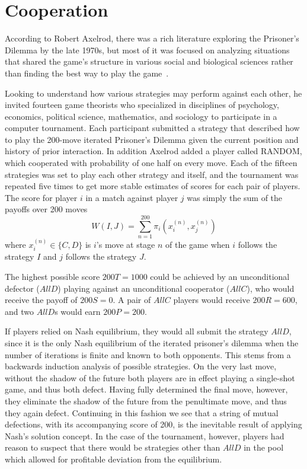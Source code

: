 \chapter{Cooperation}

According to Robert Axelrod, there was a rich literature exploring the Prisoner's Dilemma by the late 1970s, but most of it was focused on analyzing situations that shared the game's structure in various social and biological sciences rather than finding the best way to play the game~\cite[p.28]{axelrod1984evolution}.

Looking to understand how various strategies may perform against each other, he invited fourteen game theorists who specialized in disciplines of psychology, economics, political science, mathematics, and sociology to participate in a computer tournament. Each participant submitted a strategy  that described how to play the 200-move iterated Prisoner's Dilemma given the current position and history of prior interaction. In addition Axelrod added a player called RANDOM, which cooperated with probability of one half on every move. Each of the fifteen strategies was set to play each other strategy and itself, and the tournament was repeated five times to get more stable estimates of scores for each pair of players. The score for player $i$ in a match against player $j$ was simply the sum of the payoffs over 200 moves
\[
W(I, J) = \sum_{n=1}^{200} \pi_i(x_i^{(n)}, x_j^{(n)}) 
\]
where $x_i^{(n)} \in \{C, D\}$ is $i$'s move at stage $n$ of the game when $i$ follows the strategy $I$ and $j$ follows the strategy $J$.

The highest possible score $200 T = 1000$ could be achieved by an unconditional defector ($AllD$) playing against an unconditional cooperator ($AllC$), who would receive the payoff of $200 S = 0$. A pair of $AllC$ players would receive $200 R = 600$, and two $AllD$s would earn $200 P = 200$.

If players relied on Nash equilibrium, they would all submit the strategy $AllD$, since it is the only Nash equilibrium of the iterated prisoner's dilemma when the number of iterations is finite and known to both opponents. This stems from a backwards induction analysis of possible strategies. On the very last move, without the shadow of the future both players are in effect playing a single-shot game, and thus both defect. Having fully determined the final move, however, they eliminate the shadow of the future from the penultimate move, and thus they again defect. Continuing in this fashion we see that a string of mutual defections, with its accompanying score of 200, is the inevitable result of applying Nash's solution concept. In the case of the tournament, however, players had reason to suspect that there would be strategies other than $AllD$ in the pool which allowed for profitable deviation from the equilibrium.

